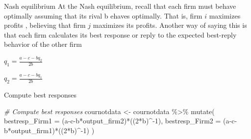 \documentclass[
  ignorenonframetext,
]{beamer}
\newenvironment{Shaded}{\begin{snugshade}}{\end{snugshade}}
\newcommand{\AttributeTok}[1]{\textcolor[rgb]{0.77,0.63,0.00}{#1}}
\newcommand{\CommentTok}[1]{\textcolor[rgb]{0.56,0.35,0.01}{\textit{#1}}}
\newcommand{\DecValTok}[1]{\textcolor[rgb]{0.00,0.00,0.81}{#1}}
\newcommand{\FunctionTok}[1]{\textcolor[rgb]{0.00,0.00,0.00}{#1}}
\newcommand{\NormalTok}[1]{#1}
\newcommand{\OtherTok}[1]{\textcolor[rgb]{0.56,0.35,0.01}{#1}}
\newcommand{\SpecialCharTok}[1]{\textcolor[rgb]{0.00,0.00,0.00}{#1}}
\begin{document}
\begin{frame}{Nash equilibrium}
\protect\hypertarget{nash-equilibrium}{}
At the Nash equilibrium, recall that each firm must behave optimally
assuming that its rival b ehaves optimally. That is, firm \(i\)
maximizes profits , believing that firm \(j\) maximizes its profits.
Another way of saying this is that each firm calculates its best
response or reply to the expected best-reply behavior of the other firm

\(q_1=\frac{a-c-bq_2}{2b}\)

\(q_2=\frac{a-c-bq_1}{2b}\)
\end{frame}

\begin{frame}[fragile]{Compute best responses}
\protect\hypertarget{compute-best-responses}{}
\begin{Shaded}
\begin{Highlighting}[]
\CommentTok{\# Compute best responses}
\NormalTok{cournotdata }\OtherTok{\textless{}{-}}\NormalTok{ cournotdata }\SpecialCharTok{\%\textgreater{}\%} 
  \FunctionTok{mutate}\NormalTok{( }\AttributeTok{bestresp\_Firm1 =}\NormalTok{ (a}\SpecialCharTok{{-}}\NormalTok{c}\SpecialCharTok{{-}}\NormalTok{b}\SpecialCharTok{*}\NormalTok{output\_firm2)}\SpecialCharTok{*}\NormalTok{((}\DecValTok{2}\SpecialCharTok{*}\NormalTok{b)}\SpecialCharTok{\^{}{-}}\DecValTok{1}\NormalTok{),}
          \AttributeTok{bestresp\_Firm2 =}\NormalTok{ (a}\SpecialCharTok{{-}}\NormalTok{c}\SpecialCharTok{{-}}\NormalTok{b}\SpecialCharTok{*}\NormalTok{output\_firm1)}\SpecialCharTok{*}\NormalTok{((}\DecValTok{2}\SpecialCharTok{*}\NormalTok{b)}\SpecialCharTok{\^{}{-}}\DecValTok{1}\NormalTok{)}
\NormalTok{          )}


\end{Highlighting}
\end{Shaded}
\end{frame}
\end{document}
